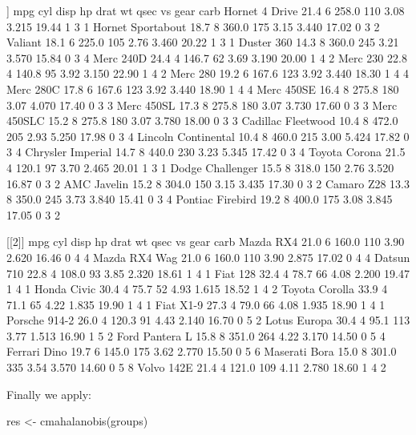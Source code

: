 \documentclass[article]{jss}
\begin{document}
\begin{Code}
[[1]]
                     mpg cyl  disp  hp drat    wt  qsec vs gear carb
Hornet 4 Drive      21.4   6 258.0 110 3.08 3.215 19.44  1    3    1
Hornet Sportabout   18.7   8 360.0 175 3.15 3.440 17.02  0    3    2
Valiant             18.1   6 225.0 105 2.76 3.460 20.22  1    3    1
Duster 360          14.3   8 360.0 245 3.21 3.570 15.84  0    3    4
Merc 240D           24.4   4 146.7  62 3.69 3.190 20.00  1    4    2
Merc 230            22.8   4 140.8  95 3.92 3.150 22.90  1    4    2
Merc 280            19.2   6 167.6 123 3.92 3.440 18.30  1    4    4
Merc 280C           17.8   6 167.6 123 3.92 3.440 18.90  1    4    4
Merc 450SE          16.4   8 275.8 180 3.07 4.070 17.40  0    3    3
Merc 450SL          17.3   8 275.8 180 3.07 3.730 17.60  0    3    3
Merc 450SLC         15.2   8 275.8 180 3.07 3.780 18.00  0    3    3
Cadillac Fleetwood  10.4   8 472.0 205 2.93 5.250 17.98  0    3    4
Lincoln Continental 10.4   8 460.0 215 3.00 5.424 17.82  0    3    4
Chrysler Imperial   14.7   8 440.0 230 3.23 5.345 17.42  0    3    4
Toyota Corona       21.5   4 120.1  97 3.70 2.465 20.01  1    3    1
Dodge Challenger    15.5   8 318.0 150 2.76 3.520 16.87  0    3    2
AMC Javelin         15.2   8 304.0 150 3.15 3.435 17.30  0    3    2
Camaro Z28          13.3   8 350.0 245 3.73 3.840 15.41  0    3    4
Pontiac Firebird    19.2   8 400.0 175 3.08 3.845 17.05  0    3    2

[[2]]
                mpg cyl  disp  hp drat    wt  qsec vs gear carb
Mazda RX4      21.0   6 160.0 110 3.90 2.620 16.46  0    4    4
Mazda RX4 Wag  21.0   6 160.0 110 3.90 2.875 17.02  0    4    4
Datsun 710     22.8   4 108.0  93 3.85 2.320 18.61  1    4    1
Fiat 128       32.4   4  78.7  66 4.08 2.200 19.47  1    4    1
Honda Civic    30.4   4  75.7  52 4.93 1.615 18.52  1    4    2
Toyota Corolla 33.9   4  71.1  65 4.22 1.835 19.90  1    4    1
Fiat X1-9      27.3   4  79.0  66 4.08 1.935 18.90  1    4    1
Porsche 914-2  26.0   4 120.3  91 4.43 2.140 16.70  0    5    2
Lotus Europa   30.4   4  95.1 113 3.77 1.513 16.90  1    5    2
Ford Pantera L 15.8   8 351.0 264 4.22 3.170 14.50  0    5    4
Ferrari Dino   19.7   6 145.0 175 3.62 2.770 15.50  0    5    6
Maserati Bora  15.0   8 301.0 335 3.54 3.570 14.60  0    5    8
Volvo 142E     21.4   4 121.0 109 4.11 2.780 18.60  1    4    2
\end{Code}

Finally we apply:
\begin{CodeChunk}
\begin{CodeInput}
res <- cmahalanobis(groups)
\end{CodeInput}
\end{CodeChunk}
\end{document}
